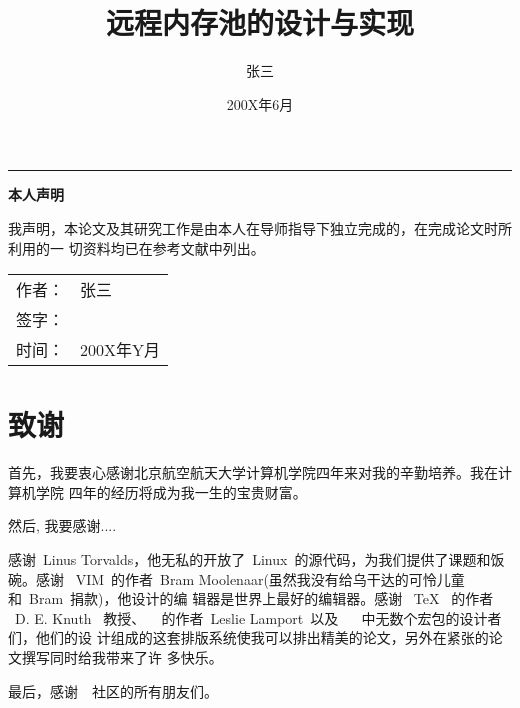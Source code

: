 \documentclass[xelatex]{BUAApaper}
\begin{document}
\author{张三}
\title{远程内存池的设计与实现}
\date{200X年6月}

\maketitle
{}
\setcounter{page}{0}


\frontmatter
\newpage
\begingroup
\hrule width0bp
\vskip54bp
\centerline{\bf{}本人声明}
\vskip27bp
我声明，本论文及其研究工作是由本人在导师指导下独立完成的，在完成论文时所利用的一
切资料均已在参考文献中列出。
\vskip63bp
\hfill	\begin{tabular}{cl}
		作者：&张三\\
		签字：&\vrule width0pt height10bp depth10bp{}\\
		时间：& 200X年Y月
	\end{tabular}
\endgroup


\tableofcontents
\newpage
\mainmatter



\newpage
\renewcommand{\thesection}{致谢}
\section*{致谢}

首先，我要衷心感谢北京航空航天大学计算机学院四年来对我的辛勤培养。我在计算机学院
四年的经历将成为我一生的宝贵财富。

然后, 我要感谢....

感谢~Linus Torvalds，他无私的开放了~Linux~的源代码，为我们提供了课题和饭碗。感谢
~VIM~的作者~Bram Moolenaar(虽然我没有给乌干达的可怜儿童和~Bram~捐款)，他设计的编
辑器是世界上最好的编辑器。感谢 ~\TeX{}~ 的作者 ~D. E. Knuth~ 教授、
~\LaTeXe{} 的作者~Leslie Lamport~以及 ~\LaTeXe{}~ 中无数个宏包的设计者们，他们的设
计组成的这套排版系统使我可以排出精美的论文，另外在紧张的论文撰写同时给我带来了许
多快乐。

最后，感谢~\CTeX~社区的所有朋友们。

\nocite{*}
\newpage
{}
\appendix
%
%
%
\clearpage
\end{document}

